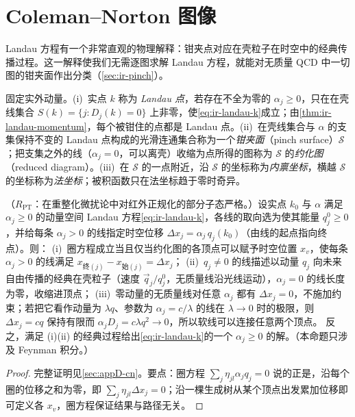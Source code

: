 \section{Coleman--Norton 图像}\label{sec:ir-coleman-norton}

Landau 方程有一个非常直观的物理解释：钳夹点对应在壳粒子在时空中的经典传播过程。这一解释使我们无需逐图求解 Landau 方程，就能对无质量 QCD 中一切图的钳夹面作出分类（\cref{sec:ir-pinch}）。

\begin{definition}\label{def:ir-pinch-surface}
固定实外动量。(i)~实点 $k$ 称为 \emph{Landau 点}，若存在不全为零的 $\alpha_j\ge0$，只在在壳线集合 $S(k)=\{j:D_j(k)=0\}$ 上非零，使\cref{eq:ir-landau-k}成立；由\cref{thm:ir-landau-momentum}，每个被钳住的点都是 Landau 点。(ii)~在壳线集合与 $\alpha$ 的支集保持不变的 Landau 点构成的光滑连通集合称为一个\emph{钳夹面}（pinch surface）$\mathcal S$；把支集之外的线（$\alpha_j=0$，可以离壳）收缩为点所得的图称为 $\mathcal S$ 的\emph{约化图}（reduced diagram）。(iii)~在 $\mathcal S$ 的一点附近，沿 $\mathcal S$ 的坐标称为\emph{内禀坐标}，横越 $\mathcal S$ 的坐标称为\emph{法坐标}；被积函数只在法坐标趋于零时奇异。
\end{definition}

\begin{proposition}\label{prop:ir-coleman-norton}
（$R_{\mathrm{PT}}$：在重整化微扰论中对红外正规化的部分子态严格。）设实点 $k_0$ 与 $\alpha$ 满足 $\alpha_j\ge0$ 的动量空间 Landau 方程\cref{eq:ir-landau-k}，各线的取向选为使其能量 $q_j^0\ge0$，并给每条 $\alpha_j>0$ 的线指定时空位移 $\Delta x_j=\alpha_j\,q_j(k_0)$（由线的起点指向终点）。则：
(i)~圈方程成立当且仅当约化图的各顶点可以赋予时空位置 $x_v$，使每条 $\alpha_j>0$ 的线满足 $x_{\text{终}(j)}-x_{\text{始}(j)}=\Delta x_j$；
(ii)~$q_j\ne0$ 的线描述以动量 $q_j$ 向未来自由传播的经典在壳粒子（速度 $\vec q_j/q_j^0$，无质量线沿光线运动），$\alpha_j=0$ 的线长度为零，收缩进顶点；
(iii)~零动量的无质量线对任意 $\alpha_j$ 都有 $\Delta x_j=0$，不施加约束；若把它看作动量为 $\lambda q$、参数为 $\alpha_j=c/\lambda$ 的线在 $\lambda\to0$ 时的极限，则 $\Delta x_j=cq$ 保持有限而 $\alpha_jD_j=c\lambda q^2\to0$，所以软线可以连接任意两个顶点。
反之，满足 (i)(ii) 的经典过程给出\cref{eq:ir-landau-k}的一个 $\alpha_j\ge0$ 的解。（本命题只涉及 Feynman 积分。）
\end{proposition}
\begin{proof}
完整证明见\cref{sec:appD-cn}。要点：圈方程 $\sum_j\eta_{jl}\alpha_jq_j=0$ 说的正是，沿每个圈的位移之和为零，即 $\sum_j\eta_{jl}\Delta x_j=0$；沿一棵生成树从某个顶点出发累加位移即可定义各 $x_v$，圈方程保证结果与路径无关。
\end{proof}

